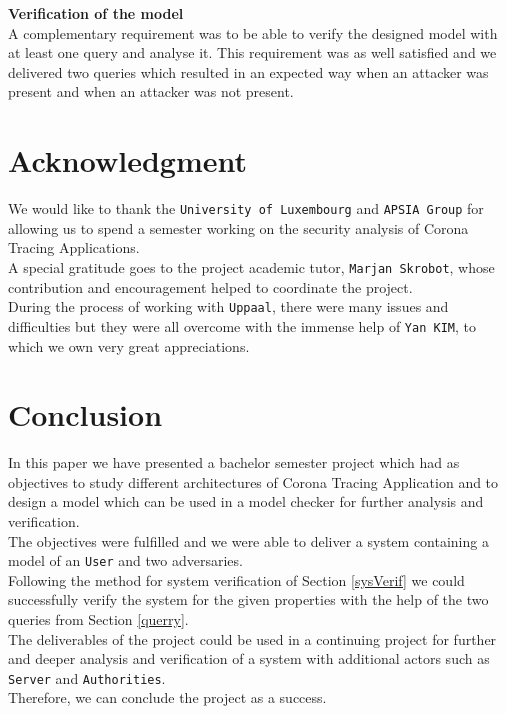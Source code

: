 \documentclass[a4paper, twocolumn]{article}
\begin{document}
\noindent\textbf{Verification of the model}\\
A complementary requirement was to be able to verify the designed model with at least one query and analyse it. This requirement was as well satisfied and we delivered two queries which resulted in an expected way when an attacker was present and when an attacker was not present.

\section*{Acknowledgment}
We would like to thank the \texttt{University of Luxembourg} and \texttt{APSIA Group} \cite{apsia} for allowing us to spend a semester working on the security analysis of Corona Tracing Applications.\\
A special gratitude goes to the project academic tutor, \texttt{Marjan Skrobot}, whose contribution and encouragement helped to coordinate the project.\\
During the process of working with \texttt{Uppaal}, there were many issues and difficulties but they were all overcome with the immense help of \texttt{Yan KIM}, to which we own very great appreciations. 

\section{Conclusion}
In this paper we have presented a bachelor semester project which had as objectives to study different architectures of Corona Tracing Application and to design a model which can be used in a model checker for further analysis and verification.\\
The objectives were fulfilled and we were able to deliver a system containing a model of an \texttt{User} and two adversaries.\\
Following the method for system verification of Section \ref{sysVerif} we could successfully verify the system for the given properties with the help of the two queries from Section \ref{querry}.\\
The deliverables of the project could be used in a continuing project for further and deeper analysis and verification of a system with additional actors such as \texttt{Server} and \texttt{Authorities}.\\
Therefore, we can conclude the project as a success.\\
\end{document}
